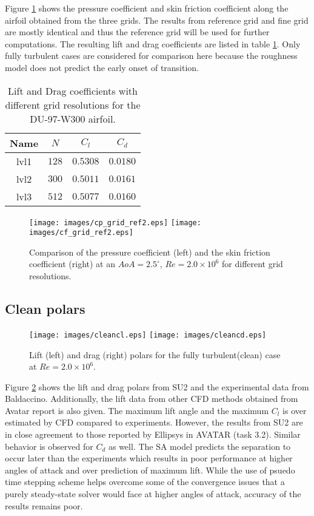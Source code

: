 Figure \ref{fig:gridrefcfcp} shows the pressure coefficient and skin friction coefficient along the airfoil obtained from the three grids. The results from reference grid and fine grid are mostly identical and thus the reference grid will be used for further computations. The resulting lift and drag coefficients are listed in table \ref{tab:gridref2}. Only fully turbulent cases are considered for comparison here because the roughness model does not predict the early onset of transition.
\begin{table}[h!]
\centering
\begin{tabular}{ |c|c|c|c| } 
\hline
Name & $N$ & $C_l$ & $C_d$  \\
 \hline
 lvl1 & $128$ & $0.5308$ & $0.0180$ \\ 
 lvl2 & $300$ & $0.5011$ & $0.0161$ \\ 
 lvl3 & $512$ & $0.5077$ & $0.0160$ \\ 
 \hline
\end{tabular}
\caption{Lift and Drag coefficients with different grid resolutions for the DU-97-W300 airfoil.}
\label{tab:gridref2}
\end{table}
\begin{figure}[h]
    \centering
    \texttt{[image: images/cp\_grid\_ref2.eps]}
    \texttt{[image: images/cf\_grid\_ref2.eps]} 
    \vspace*{-0.5cm}
    \caption{Comparison of the pressure coefficient (left) and the skin friction coefficient (right) at an $AoA = 2.5^{\circ}$, $Re=2.0\times10^6$ for different grid resolutions.}
   \label{fig:gridrefcfcp}
\end{figure}

\subsection{Clean polars}\label{ssec:clean}
\begin{figure}[h]
    \centering
    \texttt{[image: images/cleancl.eps]}
    \texttt{[image: images/cleancd.eps]} 
    \vspace*{-0.5cm}
    \caption{Lift (left) and drag (right) polars for the fully turbulent(clean) case at $Re=2.0\times10^6$.}
   \label{fig:cleanpolar}
\end{figure}
Figure \ref{fig:cleanpolar} shows the lift and drag polars from SU2 and the experimental data from Baldaccino\cite{baldacchino2018experimental}. Additionally, the lift data from other CFD methods obtained from Avatar report\cite{Schepers_2018} is also given. The maximum lift angle and the maximum $C_l$ is over estimated by CFD compared to experiments. However, the results from SU2 are in close agreement to those reported by Ellipsys in AVATAR\cite{Avatarwebsite} (task 3.2). Similar behavior is observed for $C_d$ as well. The SA model predicts the separation to occur later than the experiments which results in poor performance at higher angles of attack and over prediction of maximum lift. While the use of psuedo time stepping scheme helps overcome some of the convergence issues that a purely steady-state solver would face at higher angles of attack, accuracy of the results remains poor.


